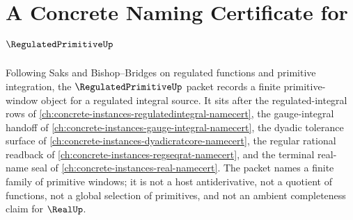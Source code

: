 \chapter{A Concrete Naming Certificate for $\RegulatedPrimitiveUp$}
\label{ch:concrete-instances-regulated-primitive-namecert}

Following Saks and Bishop--Bridges on regulated functions and primitive integration, the $\RegulatedPrimitiveUp$ packet records a finite primitive-window object for a regulated integral source. It sits after the regulated-integral rows of \autoref{ch:concrete-instances-regulatedintegral-namecert}, the gauge-integral handoff of \autoref{ch:concrete-instances-gauge-integral-namecert}, the dyadic tolerance surface of \autoref{ch:concrete-instances-dyadicratcore-namecert}, the regular rational readback of \autoref{ch:concrete-instances-regseqrat-namecert}, and the terminal real-name seal of \autoref{ch:concrete-instances-real-namecert}. The packet names a finite family of primitive windows; it is not a host antiderivative, not a quotient of functions, not a global selection of primitives, and not an ambient completeness claim for $\RealUp$.

